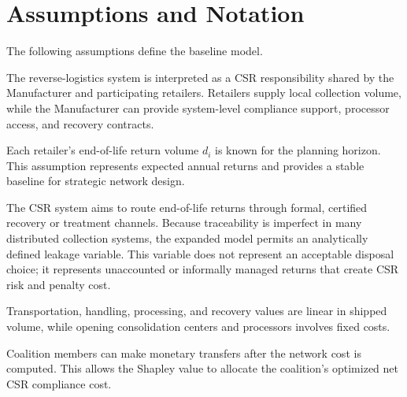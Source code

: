 \section{Assumptions and Notation}
\label{sec:notation}

The following assumptions define the baseline model.

\begin{assumption}
The reverse-logistics system is interpreted as a CSR responsibility shared by the Manufacturer and participating retailers. Retailers supply local collection volume, while the Manufacturer can provide system-level compliance support, processor access, and recovery contracts.
\end{assumption}

\begin{assumption}
Each retailer's end-of-life return volume $d_i$ is known for the planning horizon. This assumption represents expected annual returns and provides a stable baseline for strategic network design.
\end{assumption}

\begin{assumption}
The CSR system aims to route end-of-life returns through formal, certified recovery or treatment channels. Because traceability is imperfect in many distributed collection systems, the expanded model permits an analytically defined leakage variable. This variable does not represent an acceptable disposal choice; it represents unaccounted or informally managed returns that create CSR risk and penalty cost.
\end{assumption}

\begin{assumption}
Transportation, handling, processing, and recovery values are linear in shipped volume, while opening consolidation centers and processors involves fixed costs.
\end{assumption}

\begin{assumption}
Coalition members can make monetary transfers after the network cost is computed. This allows the Shapley value to allocate the coalition's optimized net CSR compliance cost.
\end{assumption}

